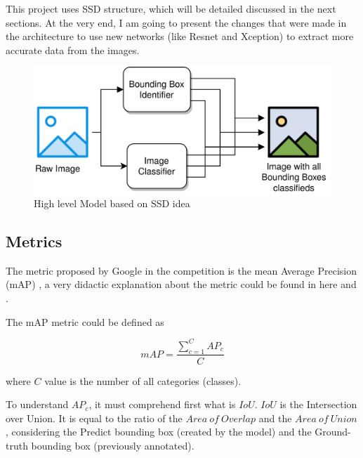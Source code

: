 \documentclass[11pt, a4paper, twocolumn]{article}
\begin{document}
This project uses SSD structure, which will be detailed discussed in the next sections. At the very end, I am going to present the changes that were made in the architecture to use new networks (like Resnet and Xception) to extract more accurate data from the images.

\begin{figure}[!ht]
	\centering
	\includegraphics[width=.4\textwidth]{high-level-architecture.jpg}
	\caption{\scriptsize High level Model based on SSD idea}
\end{figure}

\subsection{Metrics}

The metric proposed by Google in the competition is the mean Average Precision (mAP) \cite{map}, a very didactic explanation about the metric could be found in here \cite{medium:1} and \cite{medium:2}.

The mAP metric could be defined as

{\centering
	\begin{equation*}
	mAP = \frac{\sum\limits_{c=1}^{C}AP_c} {C}
	\end{equation*}}

where $C$ value is the number of all categories (classes).

To understand $AP_c$, it must comprehend first what is $IoU$. $IoU$ is the Intersection over Union. It is equal to the ratio of the $Area\ of\ Overlap$ and the $Area\ of\ Union$, considering the Predict bounding box (created by the model) and the Ground-truth bounding box (previously annotated).


\begin{figure}[!ht]
	\centering
	\qquad
	\label{fig:example}%
\end{figure}
\end{document}
